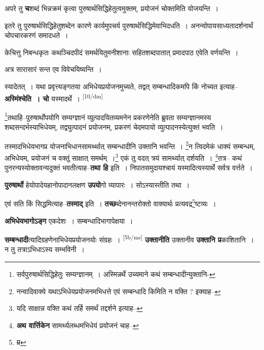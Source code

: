 \documentclass[article,12pt,a4paper]{memoir}
\begin{document}
	  \pstart अपरे तु \textbf{च}शब्दं भिन्नक्रमं कृत्वा पुरुषार्थसिद्धिहेतुत्वमुक्तम्, प्रयोजनं चोक्तमिति योजयन्ति ।
	\pend
      

	  \pstart इतरे तु पुरुषार्थसिद्धिहेतुशब्देन कारणे कार्यमुपचर्य पुरुषार्थसिद्धिमेवाभिदधति । अनन्योपायसाध्यतादर्शनार्थं चोपचारकरणं समादधते ।
	\pend
      

	  \pstart केचित्तु निबन्धकृतः कथञ्चिदपीदं समर्थयितुमनीशानाः सहितशब्दपातात् प्रमादपाठ एवेति वर्णयन्ति ।
	\pend
      

	  \pstart अत्र सारासारं सन्त एव विवेचयिष्यन्ति ।
	\pend
      

	  \pstart स्यादेतत् । यथा प्रवृत्त्यङ्गतया अभिधेयप्रयोजनमुच्यते, तद्वत् सम्बन्धादिकमपि किं नोच्यत इत्याह--\textbf{अस्मिंश्चेति । चो} यस्मादर्थे ।  \leavevmode\textsuperscript{\rmlatinfont\tiny [10/dm]} 
	  
	\footnote{सर्वपुरुषार्थसिद्धिहेतुः सम्यग्ज्ञानम् । अस्मिन्नर्थे उच्यमाने कथं सम्बन्धादीन्युक्तानि-\cite{dp-msD-n}}तथाहि--पुरुषार्थोपयोगि सम्यग्ज्ञानं व्युत्पादयितव्यमनेन प्रकरणेनेति ब्रुवता सम्यग्ज्ञानमस्य शब्दसन्दर्भस्याभिधेयम्, तद्व्युत्पादनं प्रयोजनम्, प्रकरणं चेदमपायो व्युत्पादनस्येत्युक्तं भवति । 
	  
	तस्मादभिधेयभागप्र योजनाभिधानसामर्थ्थात् सम्बन्धादीनि उक्तानि भवन्ति । \footnote{नन्वादिवाक्ये यथाऽभिधेयप्रयोजनमभिधत्ते एवं सम्बन्धादि किमिति न वक्ति ? इक्याह--\cite{dp-msD-n}}न त्विदमेकं धाक्यं सम्बन्धम्, अभिधेयम्, प्रयोजनं च वक्तुं साक्षात् समर्थम् ।\footnote{यदि साक्षान्न वक्ति कथं तर्हि समर्थं तद्दर्शने इत्याह--\cite{dp-msD-n}} एकं तु वदत् त्रयं सामर्थ्यात् दर्शयति । \footnote{\textbf{अथ वार्त्तिकेन} सामर्थ्यलब्धमभिधेयं प्रयोजनं चाह--\cite{dp-msD-n}}तत्र-- कथं पुनरन्यस्योक्तावन्यदुक्तं भवतीत्याह--\textbf{तथा हि} इति । निपातसमुदायश्चायं यस्मादित्यस्यार्थे सर्वत्र वर्त्तते ।
	\pend
      

	  \pstart \textbf{पुरुषार्थो} हेयोपादेयहानोपादानलक्षण \textbf{उपयो}गो व्यापारः । सोऽस्यास्तीति तथा ।
	\pend
      

	  \pstart एवं सति किं सिद्धमित्याह--\textbf{तस्माद्} इति । \textbf{तच्छ}ब्देनानन्तरोक्तो वाक्यार्थः प्रत्यवद्र\footnote{म्र}ष्टव्यः ।
	\pend
      

	  \pstart \textbf{अभिधेयभागोऽङ्ग} एकदेशः । सम्बन्धादिभागापेक्षया ।
	\pend
      

	  \pstart \textbf{सम्बन्धादी}त्यादिग्रहणेनाभिधेयप्रयोजनयोः संग्रहः । \leavevmode\textsuperscript{\rmlatinfont\tiny [5b/ms]} \textbf{उक्तानीति} उक्तानीव \textbf{उक्तानि प्र}काशितानि । न तु तत्राऽभिधाऽस्य सम्भविनी ।
	\pend
      
\end{document}

